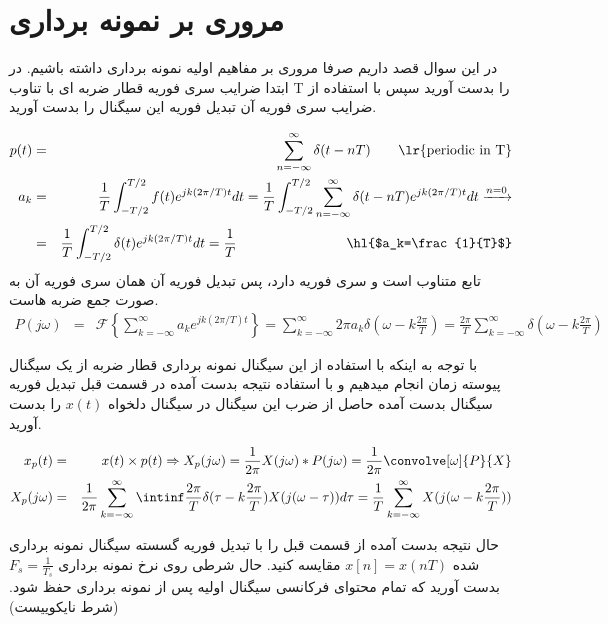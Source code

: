 \section{مروری بر نمونه برداری}

در این سوال قصد داریم صرفا مروری بر مفاهیم اولیه نمونه برداری داشته باشیم. در ابتدا ضرایب سری فوریه قطار ضربه ای با تناوب T را بدست
آورید سپس با استفاده از ضرایب سری فوریه آن تبدیل فوریه این سیگنال را بدست آورید.

\begin{qsolve}[]
	\begin{eqnarray*}
		p(t)&=&\sum_{n=-\infty}^{\infty}\delta(t-nT)\qquad \text{\lr{periodic in T}}\\
		a_k &=&\frac{1}{T}\int_{-T/2}^{T/2}f(t)e^{jk(2\pi/T)t}dt=
		\frac{1}{T}\int_{-T/2}^{T/2}\sum_{n=-\infty}^{\infty}\delta(t-nT)e^{jk(2\pi/T)t}dt
		\xrightarrow{n=0}\\
		&=&\frac{1}{T}\int_{-T/2}^{T/2}\delta(t)e^{jk(2\pi/T)t}dt=\frac{1}{T}
		\hspace{8em}\text{\hl{$a_k=\frac{1}{T}$}}
	\end{eqnarray*}
	تابع متناوب است و سری فوریه دارد، پس تبدیل فوریه آن همان سری فوریه آن به صورت
	جمع ضربه هاست.
	\begin{eqnarray*}
		P(j\omega)&=&\mathcal{F}\left\{\sum_{k=-\infty}^{\infty}a_ke^{jk(2\pi/T)t}\right\}=\sum_{k=-\infty}^{\infty}2\pi a_k\delta(\omega-k\frac{2\pi}{T})
		=\frac{2\pi}{T}\sum_{k=-\infty}^{\infty}\delta(\omega-k\frac{2\pi}{T})
	\end{eqnarray*}
\end{qsolve}

با توجه به اینکه با استفاده از این سیگنال نمونه برداری قطار ضربه از یک سیگنال پیوسته زمان انجام میدهیم و با استفاده نتیجه بدست آمده در قسمت
قبل تبدیل فوریه سیگنال بدست آمده حاصل از ضرب این سیگنال در سیگنال دلخواه $x(t)$ را بدست آورید.

\begin{qsolve}[]
	\begin{eqnarray*}
		x_p(t)&=&x(t)\times p(t)\Rightarrow X_p(j\omega)=\frac{1}{2\pi}X(j\omega)*P(j\omega)
		=\frac{1}{2\pi}\convolve[\omega]{P}{X}\\
		X_p(j\omega)&=&\frac{1}{2\pi}\sum_{k=-\infty}^{\infty}\intinf \frac{2\pi}{T}\delta(\tau-k\frac{2\pi}{T})X(j(\omega-\tau))d\tau
		=\frac{1}{T}\sum_{k=-\infty}^{\infty}X(j(\omega-k\frac{2\pi}{T}))
	\end{eqnarray*}
\end{qsolve}

حال نتیجه بدست آمده از قسمت قبل را با تبدیل فوریه گسسته سیگنال نمونه برداری شده $x[n]=x(nT)$ مقایسه کنید. حال شرطی روی نرخ
نمونه برداری $F_s=\frac{1}{T_s}$ بدست آورید که تمام محتوای فرکانسی سیگنال اولیه پس از نمونه برداری حفظ شود. (شرط نایکوییست)

